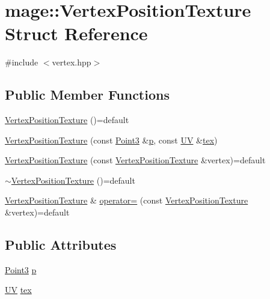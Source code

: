 \hypertarget{structmage_1_1_vertex_position_texture}{}\section{mage\+:\+:Vertex\+Position\+Texture Struct Reference}
\label{structmage_1_1_vertex_position_texture}


{\ttfamily \#include $<$vertex.\+hpp$>$}

\subsection*{Public Member Functions}
\begin{DoxyCompactItemize}
\item 
\hyperlink{structmage_1_1_vertex_position_texture_ada4dbdc6e21b7408f1bfe69d821a4b48}{Vertex\+Position\+Texture} ()=default
\item 
\hyperlink{structmage_1_1_vertex_position_texture_aa4037156fff314fb2780db6e3acaea50}{Vertex\+Position\+Texture} (const \hyperlink{structmage_1_1_point3}{Point3} \&\hyperlink{structmage_1_1_vertex_position_texture_a49253c4db52d1a4905838ba6ed6c52c6}{p}, const \hyperlink{structmage_1_1_u_v}{UV} \&\hyperlink{structmage_1_1_vertex_position_texture_a9b4efa25d268c812892ecffc2582496e}{tex})
\item 
\hyperlink{structmage_1_1_vertex_position_texture_af5f2e5beed20c22c8de29b118a5b76d5}{Vertex\+Position\+Texture} (const \hyperlink{structmage_1_1_vertex_position_texture}{Vertex\+Position\+Texture} \&vertex)=default
\item 
\hyperlink{structmage_1_1_vertex_position_texture_abafd9b5ff2067834916b522d58b5764f}{$\sim$\+Vertex\+Position\+Texture} ()=default
\item 
\hyperlink{structmage_1_1_vertex_position_texture}{Vertex\+Position\+Texture} \& \hyperlink{structmage_1_1_vertex_position_texture_adae15e832eaf7624c32865a11d0d8234}{operator=} (const \hyperlink{structmage_1_1_vertex_position_texture}{Vertex\+Position\+Texture} \&vertex)=default
\end{DoxyCompactItemize}
\subsection*{Public Attributes}
\begin{DoxyCompactItemize}
\item 
\hyperlink{structmage_1_1_point3}{Point3} \hyperlink{structmage_1_1_vertex_position_texture_a49253c4db52d1a4905838ba6ed6c52c6}{p}
\item 
\hyperlink{structmage_1_1_u_v}{UV} \hyperlink{structmage_1_1_vertex_position_texture_a9b4efa25d268c812892ecffc2582496e}{tex}
\end{DoxyCompactItemize}
